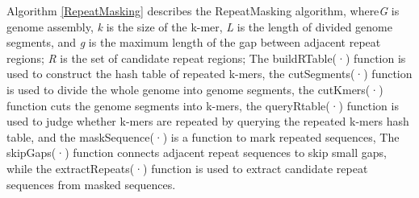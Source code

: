 \documentclass{bmcart}
\begin{document}

Algorithm \ref{RepeatMasking} describes the RepeatMasking algorithm, where\emph{G} is genome assembly, \emph{k} is the size of the k-mer, \emph{L} is the length of divided genome segments, and \emph{g} is the maximum length of the gap between adjacent repeat regions; \emph{R} is the set of candidate repeat regions; The buildRTable(·) function is used to construct the hash table of repeated k-mers, the cutSegments(·) function is used to divide the whole genome into genome segments, the cutKmers(·) function cuts the genome segments into k-mers, the queryRtable(·) function is used to judge whether k-mers are repeated by querying the repeated k-mers hash table, and the maskSequence(·) is a function to mark repeated sequences, The skipGaps(·) function connects adjacent repeat sequences to skip small gaps, while the extractRepeats(·) function is used to extract candidate repeat sequences from masked sequences.
\end{document}
